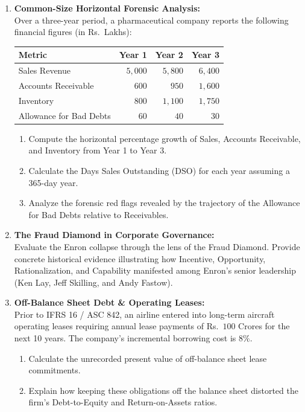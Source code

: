 \begin{enumerate}[label=\textbf{P2.\arabic*}]
    \item \textbf{Common-Size Horizontal Forensic Analysis:}\\
    Over a three-year period, a pharmaceutical company reports the following financial figures (in Rs.~Lakhs):
    \begin{center}
    \begin{tabular}{lrrr}
    \toprule
    \textbf{Metric} & \textbf{Year 1} & \textbf{Year 2} & \textbf{Year 3} \\
    \midrule
    Sales Revenue & $5{,}000$ & $5{,}800$ & $6{,}400$ \\
    Accounts Receivable & $600$ & $950$ & $1{,}600$ \\
    Inventory & $800$ & $1{,}100$ & $1{,}750$ \\
    Allowance for Bad Debts & $60$ & $40$ & $30$ \\
    \bottomrule
    \end{tabular}
    \end{center}
    \begin{enumerate}[label=(\alph*)]
        \item Compute the horizontal percentage growth of Sales, Accounts Receivable, and Inventory from Year 1 to Year 3.
        \item Calculate the Days Sales Outstanding (DSO) for each year assuming a 365-day year.
        \item Analyze the forensic red flags revealed by the trajectory of the Allowance for Bad Debts relative to Receivables.
    \end{enumerate}

    \item \textbf{The Fraud Diamond in Corporate Governance:}\\
    Evaluate the Enron collapse through the lens of the Fraud Diamond. Provide concrete historical evidence illustrating how Incentive, Opportunity, Rationalization, and Capability manifested among Enron's senior leadership (Ken Lay, Jeff Skilling, and Andy Fastow).

    \item \textbf{Off-Balance Sheet Debt \& Operating Leases:}\\
    Prior to IFRS 16 / ASC 842, an airline entered into long-term aircraft operating leases requiring annual lease payments of Rs.~$100$ Crores for the next 10 years. The company's incremental borrowing cost is $8\%$.
    \begin{enumerate}[label=(\alph*)]
        \item Calculate the unrecorded present value of off-balance sheet lease commitments.
        \item Explain how keeping these obligations off the balance sheet distorted the firm's Debt-to-Equity and Return-on-Assets ratios.
    \end{enumerate}
\end{enumerate}

